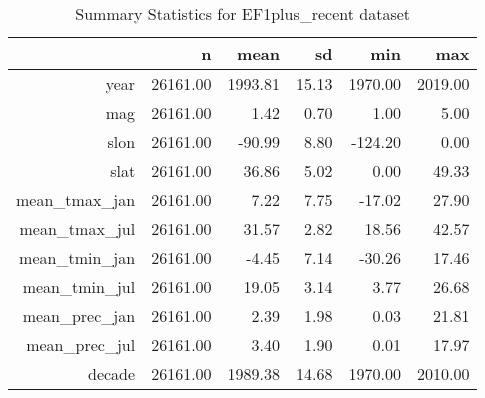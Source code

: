 \begin{table}[ht]
\centering
\caption{Summary Statistics for EF1plus_recent dataset} 
\begin{tabular}{rrrrrr}
  \hline
 & n & mean & sd & min & max \\ 
  \hline
year & 26161.00 & 1993.81 & 15.13 & 1970.00 & 2019.00 \\ 
  mag & 26161.00 & 1.42 & 0.70 & 1.00 & 5.00 \\ 
  slon & 26161.00 & -90.99 & 8.80 & -124.20 & 0.00 \\ 
  slat & 26161.00 & 36.86 & 5.02 & 0.00 & 49.33 \\ 
  mean\_tmax\_jan & 26161.00 & 7.22 & 7.75 & -17.02 & 27.90 \\ 
  mean\_tmax\_jul & 26161.00 & 31.57 & 2.82 & 18.56 & 42.57 \\ 
  mean\_tmin\_jan & 26161.00 & -4.45 & 7.14 & -30.26 & 17.46 \\ 
  mean\_tmin\_jul & 26161.00 & 19.05 & 3.14 & 3.77 & 26.68 \\ 
  mean\_prec\_jan & 26161.00 & 2.39 & 1.98 & 0.03 & 21.81 \\ 
  mean\_prec\_jul & 26161.00 & 3.40 & 1.90 & 0.01 & 17.97 \\ 
  decade & 26161.00 & 1989.38 & 14.68 & 1970.00 & 2010.00 \\ 
   \hline
\end{tabular}
\end{table}
